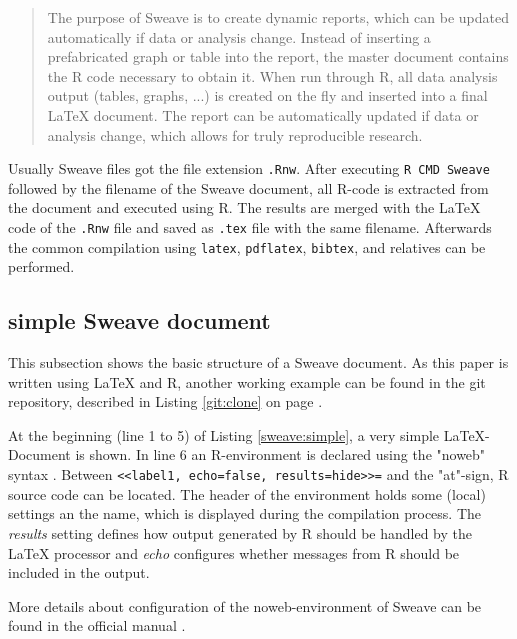 \documentclass{ifacconf}
\begin{document}
\begin{quotation}
The purpose of Sweave is to create dynamic reports, 
which can be updated automatically if data or
analysis change. Instead of inserting a prefabricated
graph or table into the report, the master document
contains the R code necessary to obtain it. When run
through R, all data analysis output (tables, graphs, ...) 
is created on the fly and inserted into a final \LaTeX{}
document. The report can be automatically updated
if data or analysis change, which allows for truly reproducible research.
\end{quotation}

Usually Sweave files got the file extension \texttt{.Rnw}. 
After executing \texttt{R CMD Sweave} followed by the filename
of the Sweave document, all R-code is extracted from the document and executed using R.
The results are merged with the \LaTeX{} code of the \texttt{.Rnw} file and saved
as \texttt{.tex} file with the same filename. Afterwards the common 
compilation using \texttt{latex}, \texttt{pdflatex}, \texttt{bibtex}, and relatives
can be performed.

\subsection{simple Sweave document}

This subsection shows the basic structure of a Sweave document. As this
paper is written using \LaTeX{} and R, another working example can be found
in the git repository, described in Listing \ref{git:clone} on page
\pageref{git:clone}.

At the beginning (line 1 to 5) of Listing \ref{sweave:simple}, a very simple
\LaTeX-Document is shown. In line 6 an R-environment is declared using 
the "noweb" syntax \citep{Ramsey_1994, Johnson_Johnson_2000}.
Between \newline \texttt{<<label1, echo=false, results=hide>>=} \newline and the
"at"-sign, R source code can be located. The header of the environment holds
some (local) settings an the name, which is displayed during the
compilation process. The \textit{results} setting defines how
output generated by R should be handled by the \LaTeX{} processor and \textit{echo}
configures whether messages from R should be included in the output.

More details about configuration of the noweb-environment of Sweave can
be found in the official manual \citep{SweaveManual}.
\end{document}
